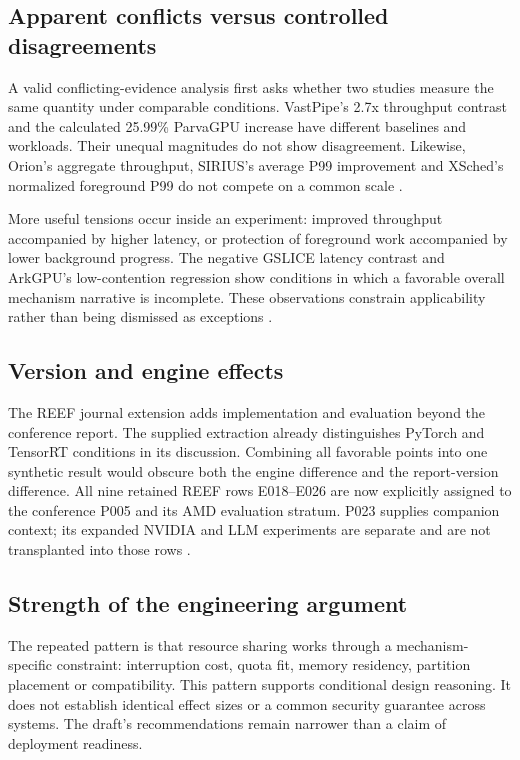 \subsection{Apparent conflicts versus controlled disagreements}
A valid conflicting-evidence analysis first asks whether two studies measure the same quantity under comparable conditions. VastPipe's 2.7x throughput contrast and the calculated 25.99\% ParvaGPU increase have different baselines and workloads. Their unequal magnitudes do not show disagreement. Likewise, Orion's aggregate throughput, SIRIUS's average P99 improvement and XSched's normalized foreground P99 do not compete on a common scale \cite{P001,P007,P010,P011,P015}.

More useful tensions occur inside an experiment: improved throughput accompanied by higher latency, or protection of foreground work accompanied by lower background progress. The negative GSLICE latency contrast and ArkGPU's low-contention regression show conditions in which a favorable overall mechanism narrative is incomplete. These observations constrain applicability rather than being dismissed as exceptions \cite{P008,P019}.

\subsection{Version and engine effects}
The REEF journal extension adds implementation and evaluation beyond the conference report. The supplied extraction already distinguishes PyTorch and TensorRT conditions in its discussion. Combining all favorable points into one synthetic result would obscure both the engine difference and the report-version difference. All nine retained REEF rows E018--E026 are now explicitly assigned to the conference P005 and its AMD evaluation stratum. P023 supplies companion context; its expanded NVIDIA and LLM experiments are separate and are not transplanted into those rows \cite{P005,P023}.

\subsection{Strength of the engineering argument}
The repeated pattern is that resource sharing works through a mechanism-specific constraint: interruption cost, quota fit, memory residency, partition placement or compatibility. This pattern supports conditional design reasoning. It does not establish identical effect sizes or a common security guarantee across systems. The draft's recommendations remain narrower than a claim of deployment readiness.

